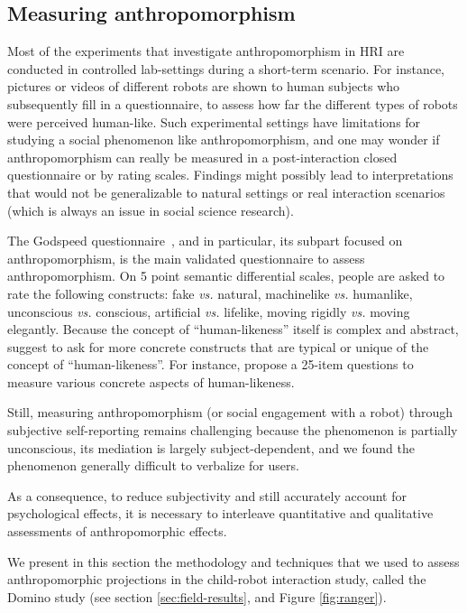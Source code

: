 \documentclass{frontiersSCNS} %
\newcommand{\vs}{\textit{vs.}\xspace}
\begin{document}
\subsection{Measuring anthropomorphism}
\label{sec:measuring}

Most of the experiments that investigate anthropomorphism in HRI are conducted
in controlled lab-settings during a short-term scenario. For instance, pictures
or videos of different robots are shown to human subjects who subsequently fill
in a questionnaire, to assess how far the different types of robots were
perceived human-like. Such experimental settings have limitations for studying a
social phenomenon like anthropomorphism, and one may wonder if anthropomorphism
can really be measured in a post-interaction closed questionnaire or by rating
scales. Findings might possibly lead to interpretations that would not be
generalizable to natural settings or real interaction scenarios (which is always
an issue in social science research).

The Godspeed questionnaire~\citep{bartneck_measurement_2008}, and in particular,
its subpart focused on anthropomorphism, is the main validated questionnaire to
assess anthropomorphism. On 5 point semantic differential scales, people are
asked to rate the following constructs: fake \vs natural, machinelike \vs
humanlike, unconscious \vs conscious, artificial \vs lifelike, moving rigidly
\vs moving elegantly. Because the concept of ``human-likeness'' itself is
complex and abstract, \cite{kahn_jr._robotic_2006} suggest to ask for more
concrete constructs that are typical or unique of the concept of
``human-likeness''.  For instance, \cite{ruijten_introducing_2014} propose a
25-item questions to measure various concrete aspects of human-likeness.

Still, measuring anthropomorphism (or social engagement with a robot) through
subjective self-reporting remains challenging because the phenomenon is
partially unconscious, its mediation is largely subject-dependent, and we found
the phenomenon generally difficult to verbalize for users.

As a consequence, to reduce subjectivity and still accurately account for
psychological effects, it is necessary to interleave quantitative and
qualitative assessments of anthropomorphic effects.

We present in this section the methodology and techniques that we used to assess
anthropomorphic projections in the child-robot interaction study, called the
Domino study (see section \ref{sec:field-results}, and Figure \ref{fig:ranger}).
\end{document}

